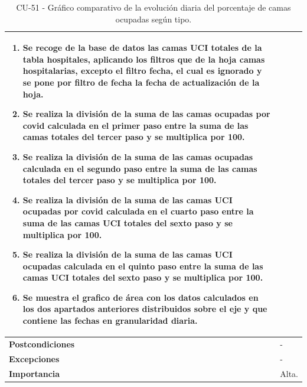 \begin{table}[ht!]
{\begin{tabular}{|l|l|}
{\begin{enumerate}
                 \item Se recoge de la base de datos las camas UCI totales de la tabla hospitales, aplicando los filtros que de la hoja camas hospitalarias, excepto el filtro fecha, el cual es ignorado y se pone por filtro de fecha la fecha de actualización de la hoja.
                 \item Se realiza la división de la suma de las camas ocupadas por covid calculada en el primer paso entre la suma de las camas totales del tercer paso y se multiplica por 100.    \item Se realiza la división de la suma de las camas ocupadas calculada en el segundo paso entre la suma de las camas totales del tercer paso y se multiplica por 100.
                 \item Se realiza la división de la suma de las camas UCI ocupadas por covid calculada en el cuarto paso entre la suma de las camas UCI totales del sexto paso y se multiplica por 100.
                 \item Se realiza la división de la suma de las camas UCI ocupadas calculada en el quinto paso entre la suma de las camas UCI totales del sexto paso y se multiplica por 100.
                 \item Se muestra el grafico de área con los datos calculados en los dos apartados anteriores distribuidos sobre el eje y que contiene las fechas en granularidad diaria.
            \end{enumerate}} \\ \hline
         \textbf{Postcondiciones}       & - \\ \hline
         \textbf{Excepciones}       & - \\ \hline
         \textbf{Importancia}   & Alta. \\
         \hline
    \end{tabular}}
    \caption{CU-51 - Gráfico comparativo de la evolución diaria del
porcentaje de camas ocupadas según tipo.}
    \label{tab:my_label}
\end{table}

